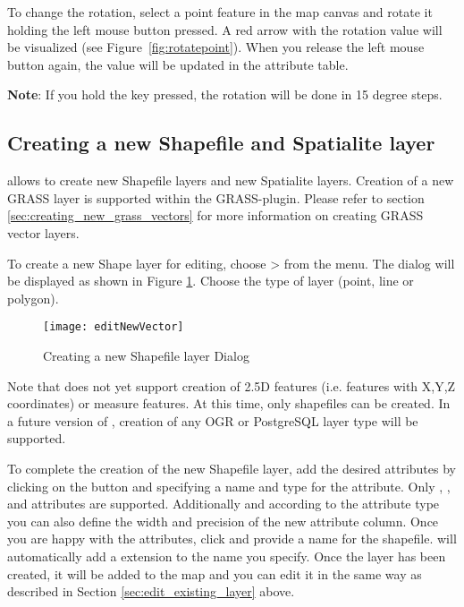 To change the rotation, select a point feature in the map canvas and rotate
it holding the left mouse button pressed. A red arrow with the rotation value
will be visualized (see Figure~\ref{fig:rotatepoint}). When you release the
left mouse button again, the value will be updated in the attribute table.

\textbf{Note}: If you hold the  key pressed, the rotation will be done
in 15 degree steps.

\subsection{Creating a new Shapefile and Spatialite layer}\label{sec:create shape}

\qg allows to create new Shapefile layers and new Spatialite layers.
Creation of a new GRASS layer is supported within the GRASS-plugin. Please refer
to section \ref{sec:creating_new_grass_vectors} for more information on
creating GRASS vector layers.

\label{sec:create shape}

To create a new Shape layer for editing, choose  >
 from the
 menu. The  dialog will be
displayed as shown in Figure \ref{fig:newvectorlayer}. Choose the type of
layer (point, line or polygon).

\begin{figure}[ht]
   \centering
   \texttt{[image: editNewVector]}
   \caption{Creating a new Shapefile layer Dialog \nixcaption}\label{fig:newvectorlayer}
\end{figure}

Note that \qg does not yet support creation of 2.5D
features (i.e. features with X,Y,Z coordinates) or measure features. At this
time, only shapefiles can be created. In a future version of \qg, creation of
any OGR or PostgreSQL layer type will be supported.

To complete the creation of the new Shapefile layer, add the desired attributes by
clicking on the  button and specifying a name and type for the
attribute. Only , , and
 attributes are supported. Additionally and
according to the attribute type you can also define the width and precision
of the new attribute column. Once you are happy with the attributes, click
 and provide a name for the shapefile. \qg will automatically add
a  extension to the name you specify. Once
the layer has been created, it will be added to the map and you can edit it in
the same way as described in Section \ref{sec:edit_existing_layer} above.

